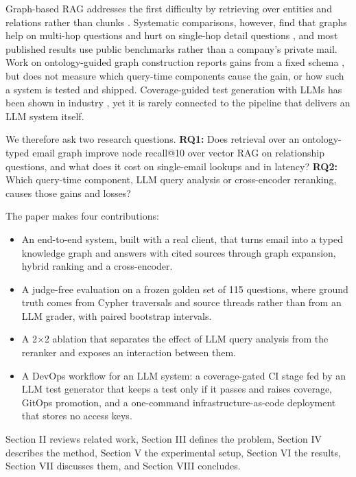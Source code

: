 \documentclass[12pt,onecolumn,draftclsnofoot]{IEEEtran}
\begin{document}
Graph-based RAG addresses the first difficulty by retrieving over entities and relations rather than chunks \cite{edge2024graphrag,peng2024graphragsurvey}. Systematic comparisons, however, find that graphs help on multi-hop questions and hurt on single-hop detail questions \cite{han2025ragvsgraphrag,xiang2025graphragbench}, and most published results use public benchmarks rather than a company's private mail. Work on ontology-guided graph construction reports gains from a fixed schema \cite{dacruz2025ontology,wang2026omdgraphrag}, but does not measure which query-time components cause the gain, or how such a system is tested and shipped. Coverage-guided test generation with LLMs has been shown in industry \cite{alshahwan2024testgen}, yet it is rarely connected to the pipeline that delivers an LLM system itself.

We therefore ask two research questions. \textbf{RQ1:} Does retrieval over an ontology-typed email graph improve node recall@10 over vector RAG on relationship questions, and what does it cost on single-email lookups and in latency? \textbf{RQ2:} Which query-time component, LLM query analysis or cross-encoder reranking, causes those gains and losses?

The paper makes four contributions:
\begin{itemize}
\item An end-to-end system, built with a real client, that turns email into a typed knowledge graph and answers with cited sources through graph expansion, hybrid ranking and a cross-encoder.
\item A judge-free evaluation on a frozen golden set of 115 questions, where ground truth comes from Cypher traversals and source threads rather than from an LLM grader, with paired bootstrap intervals.
\item A 2$\times$2 ablation that separates the effect of LLM query analysis from the reranker and exposes an interaction between them.
\item A DevOps workflow for an LLM system: a coverage-gated CI stage fed by an LLM test generator that keeps a test only if it passes and raises coverage, GitOps promotion, and a one-command infrastructure-as-code deployment that stores no access keys.
\end{itemize}

Section II reviews related work, Section III defines the problem, Section IV describes the method, Section V the experimental setup, Section VI the results, Section VII discusses them, and Section VIII concludes.
\end{document}
